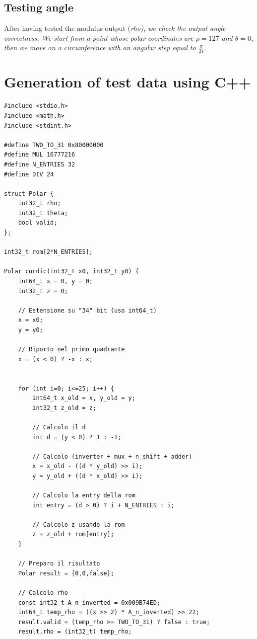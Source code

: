 \documentclass[12pt,a4paper]{report}
\begin{document}
\subsection{Testing angle}
After having tested the modulus output (\em{rho}), we check the output angle correctness. We start from a point whose polar coordinates are $\rho=127$ and $\theta=0$, then we move on a circumference with an angular step equal to $\frac{\pi}{24}$.

\section{Generation of test data using C++}

\begin{lstlisting}[caption={Test-data generation}]
#include <stdio.h>
#include <math.h>
#include <stdint.h>

#define TWO_TO_31 0x80000000
#define MUL 16777216
#define N_ENTRIES 32
#define DIV 24

struct Polar {
    int32_t rho;
    int32_t theta;
    bool valid;
};

int32_t rom[2*N_ENTRIES];

Polar cordic(int32_t x0, int32_t y0) {
    int64_t x = 0, y = 0;
    int32_t z = 0;
    
    // Estensione su "34" bit (uso int64_t)
    x = x0;
    y = y0;
    
    // Riporto nel primo quadrante
    x = (x < 0) ? -x : x;
    
    
    for (int i=0; i<=25; i++) {
        int64_t x_old = x, y_old = y;
        int32_t z_old = z;
        
        // Calcolo il d
        int d = (y < 0) ? 1 : -1;
        
        // Calcolo (inverter + mux + n_shift + adder)
        x = x_old - ((d * y_old) >> i);
        y = y_old + ((d * x_old) >> i);
        
        // Calcolo la entry della rom
        int entry = (d > 0) ? i + N_ENTRIES : i;
        
        // Calcolo z usando la rom
        z = z_old + rom[entry];
    }
    
    // Preparo il risultato
    Polar result = {0,0,false};
    
    // Calcolo rho
    const int32_t A_n_inverted = 0x009B74ED;
    int64_t temp_rho = ((x >> 2) * A_n_inverted) >> 22;
    result.valid = (temp_rho >= TWO_TO_31) ? false : true;
    result.rho = (int32_t) temp_rho;
    

\end{lstlisting}
\end{document}
